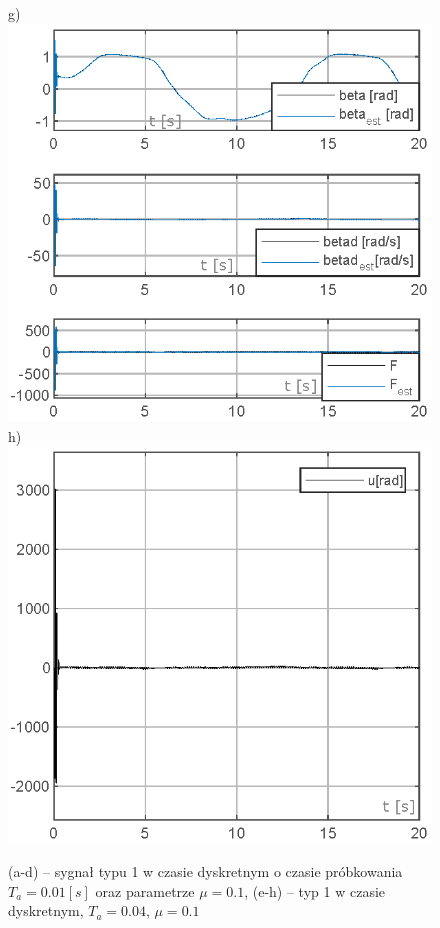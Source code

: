 \documentclass[10pt, a4paper]{article}
\begin{document}
\begin{figure}[ht]
	g) \includegraphics[width=0.22\columnwidth]{ACex6/figs/FIG4_b_tdescrete_sin_Ta0.04/StateVar_tdescrete_sin_Ta0.04} 
	h) \includegraphics[width=0.22\columnwidth]{ACex6/figs/FIG4_b_tdescrete_sin_Ta0.04/U_tdescrete_sin_Ta0.04}
	\caption{(a-d) – sygnał typu 1 w czasie dyskretnym o czasie próbkowania $T_a = 0.01[s]$ oraz parametrze $\mu = 0.1$, (e-h) – typ 1 w czasie dyskretnym, $T_a = 0.04$, $\mu = 0.1$}
\end{figure}
\end{document}
